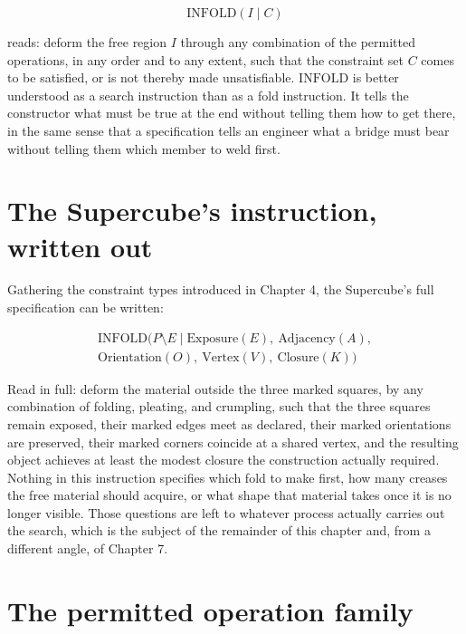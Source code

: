 \documentclass[11pt,oneside]{book}
\begin{document}
\[\text{INFOLD}(I \mid C)\]

reads: deform the free region \(I\) through any combination of the
permitted operations, in any order and to any extent, such that the
constraint set \(C\) comes to be satisfied, or is not thereby made
unsatisfiable. \(\text{INFOLD}\) is better understood as a search
instruction than as a fold instruction. It tells the constructor what
must be true at the end without telling them how to get there, in the
same sense that a specification tells an engineer what a bridge must
bear without telling them which member to weld first.

\hypertarget{the-supercubes-instruction-written-out}{%
\section{The Supercube's instruction, written
out}\label{the-supercubes-instruction-written-out}}

Gathering the constraint types introduced in Chapter 4, the Supercube's
full specification can be written:

\begin{gather*}
\text{INFOLD}(P \setminus E \mid \text{Exposure}(E),\ \text{Adjacency}(A),\\
\text{Orientation}(O),\ \text{Vertex}(V),\ \text{Closure}(K))
\end{gather*}

Read in full: deform the material outside the three marked squares, by
any combination of folding, pleating, and crumpling, such that the three
squares remain exposed, their marked edges meet as declared, their
marked orientations are preserved, their marked corners coincide at a
shared vertex, and the resulting object achieves at least the modest
closure the construction actually required. Nothing in this instruction
specifies which fold to make first, how many creases the free material
should acquire, or what shape that material takes once it is no longer
visible. Those questions are left to whatever process actually carries
out the search, which is the subject of the remainder of this chapter
and, from a different angle, of Chapter 7.

\hypertarget{the-permitted-operation-family}{%
\section{The permitted operation
family}\label{the-permitted-operation-family}}
\end{document}
